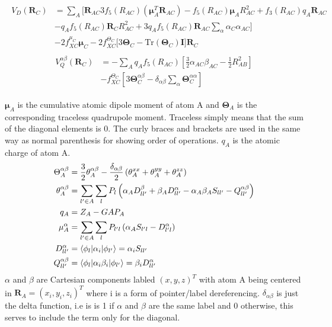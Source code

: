 \begin{align}
    \begin{split}
        V_D(\pmb{R}_C)
            &= \sum_A \Biggl[
                \pmb{R}_{AC}3f_5(R_{AC})(\pmb{\mu}_A^T\pmb{R}_{AC}) -
                f_5(R_{AC})\pmb{\mu}_AR^2_{AC} + 
                f_3(R_{AC})q_A\pmb{R}_{AC}\\
            &-q_Af_5(R_{AC})\pmb{R}_CR_{AC}^2 + 
                3q_Af_5(R_{AC})\pmb{R}_{AC}\sum_\alpha\alpha_C\alpha_{AC}\Biggr]\\
      &-2f_{XC}^{\mu_C}\pmb\mu_C - 2f_{XC}^{\Theta_C}\biggl[3\pmb\Theta_C-\text{Tr}(\pmb\Theta_C)\pmb I\biggr]\pmb R_C
    \end{split}
\end{align}
\begin{align}
    \begin{split}
        V_Q^{\alpha\beta}(\pmb{R}_C)
            &= -\sum_A q_Af_5(R_{AC})\left[          
                \frac{3}{2}\alpha_{AC}\beta_{AC}- \frac{1}{2}R_{AB}^2 %
                \right]\\
        &-f_{XC}^{\Theta_C}\left[3\pmb\Theta_C^{\alpha\beta}-\delta_{\alpha\beta}\sum_\alpha\pmb\Theta_C^{\alpha\alpha}\right]
    \end{split}
\end{align}

$\pmb{\mu}_A$ is the cumulative atomic dipole moment of atom A and $\pmb{\Theta}_A$ is the corresponding traceless quadrupole moment. Traceless simply means that the sum of the diagonal elements is 0. The curly braces and brackets are used in the same way as normal parenthesis for showing order of operations. $q_A$ is the atomic charge of atom A. 
\begin{align}
    \Theta_A^{\alpha\beta} &= \frac{3}{2} \theta_A^{\alpha\beta} - \frac{\delta_{\alpha\beta}}{2} \left( \theta_A^{xx} + \theta_A^{yy} + \theta_A^{zz} \right)\\
    \theta_A^{\alpha\beta} &= \sum_{l' \in A} \sum_{l} P_{l} \left( \alpha_A D_{ll'}^{\beta} + \beta_A D_{ll'}^{\alpha} - \alpha_A \beta_A S_{ll'} - Q_{ll'}^{\alpha\beta} \right)\\
    q_A &= Z_A - GAP_A\\
    \mu_A^{\alpha} &= \sum_{l' \in A} \sum_{l} P_{l'l} \left( \alpha_A S_{l'l} - D_{l'l}^{\alpha} \right)\\
    D_{ll'}^{\alpha} &= \braket{ \phi_{l} | \alpha_i | \phi_{l'}} = \alpha_i S_{ll'}\\
    Q_{ll'}^{\alpha\beta} &= \braket{ \phi_{l} | \alpha_i\beta_i | \phi_{l'}} = \beta_i D_{ll'}^\alpha
\end{align}
$\alpha$ and $\beta$ are Cartesian components labled $(x,y,z)^T$ with atom A being centered in $\pmb{R}_A = (x_i,y_i,z_i)^T$ where i is a form of pointer/label dereferencing. $\delta_{\alpha\beta}$ is just the delta function, i.e is is 1 if $\alpha$ and $\beta$ are the same label and 0 otherwise, this serves to include the term only for the diagonal. 

